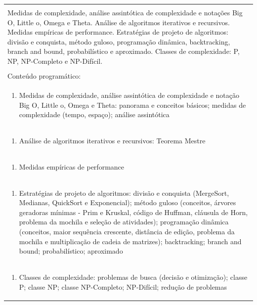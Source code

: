 \documentclass[11pt]{article}
\begin{document}
\begin{center}
\begin{longtable}{|p{4cm}|p{4cm}|p{4cm}|p{4cm}|}
\multicolumn{4}{|p{16cm}|}{}\\
\multicolumn{4}{|p{\dimexpr 16cm + 6\tabcolsep\relax}|}{Medidas de complexidade, análise assintótica de complexidade e notações Big O, Little o, Omega e Theta. Análise de algoritmos iterativos e recursivos. Medidas empíricas de performance. Estratégias de projeto de algoritmos: divisão e conquista, método guloso, programação dinâmica, backtracking, branch and bound, probabilístico e aproximado. Classes de complexidade: P, NP, NP-Completo e NP-Difícil.}\\
\multicolumn{4}{|p{16cm}|}{}\\
\hline
\multicolumn{4}{|p{16cm}|}{Conteúdo programático:}\\*
\multicolumn{4}{|p{\dimexpr 16cm + 6\tabcolsep\relax}|}{\begin{enumerate}[start=1]\item Medidas de complexidade, análise assintótica de complexidade e notação Big O, Little o, Omega e Theta: panorama e conceitos básicos; medidas de complexidade (tempo, espaço); análise assintótica\end{enumerate}}\\
\multicolumn{4}{|p{\dimexpr 16cm + 6\tabcolsep\relax}|}{\begin{enumerate}[start=2]\item Análise de algoritmos iterativos e recursivos: Teorema Mestre\end{enumerate}}\\
\multicolumn{4}{|p{\dimexpr 16cm + 6\tabcolsep\relax}|}{\begin{enumerate}[start=3]\item Medidas empíricas de performance\end{enumerate}}\\
\multicolumn{4}{|p{\dimexpr 16cm + 6\tabcolsep\relax}|}{\begin{enumerate}[start=4]\item Estratégias de projeto de algoritmos: divisão e conquista (MergeSort, Medianas, QuickSort e Exponencial); método guloso (conceitos, árvores geradoras mínimas - Prim e Kruskal, código de Huffman, cláusula de Horn, problema da mochila e seleção de atividades); programação dinâmica (conceitos, maior sequência crescente, distância de edição, problema da mochila e multiplicação de cadeia de matrizes); backtracking; branch and bound; probabilístico; aproximado\end{enumerate}}\\
\multicolumn{4}{|p{\dimexpr 16cm + 6\tabcolsep\relax}|}{\begin{enumerate}[start=5]\item Classes de complexidade: problemas de busca (decisão e otimização); classe P; classe NP; classe NP-Completo; NP-Difícil; redução de problemas\end{enumerate}}\\

\end{longtable}
\end{center}
\end{document}
